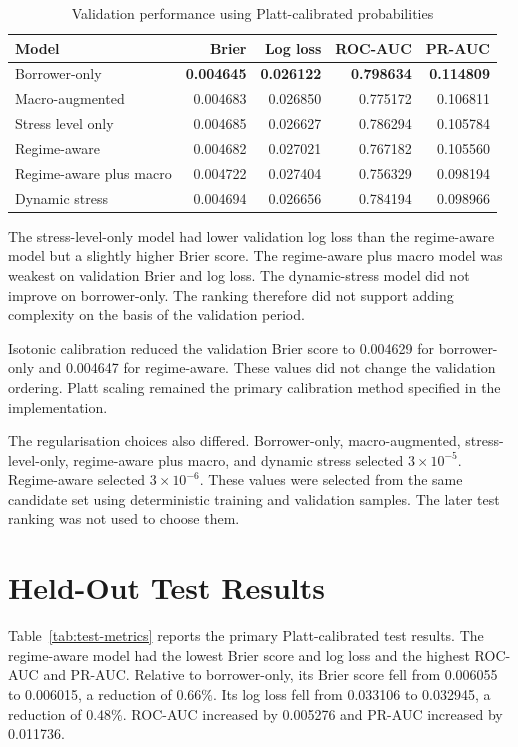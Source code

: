 \begin{table}[htbp]
\centering
\caption{Validation performance using Platt-calibrated probabilities}
\label{tab:validation-metrics}
\small
\begin{tabular}{L{0.32\textwidth}rrrr}
\toprule
Model & Brier & Log loss & ROC-AUC & PR-AUC \\
\midrule
Borrower-only & \textbf{0.004645} & \textbf{0.026122} & \textbf{0.798634} & \textbf{0.114809} \\
Macro-augmented & 0.004683 & 0.026850 & 0.775172 & 0.106811 \\
Stress level only & 0.004685 & 0.026627 & 0.786294 & 0.105784 \\
Regime-aware & 0.004682 & 0.027021 & 0.767182 & 0.105560 \\
Regime-aware plus macro & 0.004722 & 0.027404 & 0.756329 & 0.098194 \\
Dynamic stress & 0.004694 & 0.026656 & 0.784194 & 0.098966 \\
\bottomrule
\end{tabular}
\end{table}

The stress-level-only model had lower validation log loss than the regime-aware model but a slightly higher Brier score. The regime-aware plus macro model was weakest on validation Brier and log loss. The dynamic-stress model did not improve on borrower-only. The ranking therefore did not support adding complexity on the basis of the validation period.

Isotonic calibration reduced the validation Brier score to 0.004629 for borrower-only and 0.004647 for regime-aware. These values did not change the validation ordering. Platt scaling remained the primary calibration method specified in the implementation.

The regularisation choices also differed. Borrower-only, macro-augmented, stress-level-only, regime-aware plus macro, and dynamic stress selected $3\times10^{-5}$. Regime-aware selected $3\times10^{-6}$. These values were selected from the same candidate set using deterministic training and validation samples. The later test ranking was not used to choose them.

\section{Held-Out Test Results}

Table~\ref{tab:test-metrics} reports the primary Platt-calibrated test results. The regime-aware model had the lowest Brier score and log loss and the highest ROC-AUC and PR-AUC. Relative to borrower-only, its Brier score fell from 0.006055 to 0.006015, a reduction of 0.66\%. Its log loss fell from 0.033106 to 0.032945, a reduction of 0.48\%. ROC-AUC increased by 0.005276 and PR-AUC increased by 0.011736.

